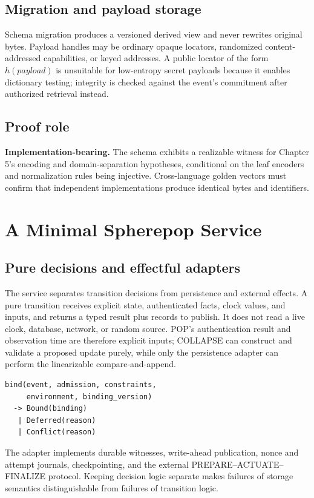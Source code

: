 \documentclass[11pt,openany]{book}
\begin{document}
\section{Migration and payload storage}
Schema migration produces a versioned derived view and never rewrites original
bytes. Payload handles may be ordinary opaque locators, randomized
content-addressed capabilities, or keyed addresses. A public locator of the
form \(h(payload)\) is unsuitable for low-entropy secret payloads because it
enables dictionary testing; integrity is checked against the event's commitment
after authorized retrieval instead.

\section{Proof role}
\textbf{Implementation-bearing.} The schema exhibits a realizable witness for
Chapter 5's encoding and domain-separation hypotheses, conditional on the leaf
encoders and normalization rules being injective. Cross-language golden vectors
must confirm that independent implementations produce identical bytes and
identifiers.

\chapter{A Minimal Spherepop Service}
\section{Pure decisions and effectful adapters}
The service separates transition decisions from persistence and external
effects. A pure transition receives explicit state, authenticated facts, clock
values, and inputs, and returns a typed result plus records to publish. It does
not read a live clock, database, network, or random source. POP's authentication
result and observation time are therefore explicit inputs; COLLAPSE can
construct and validate a proposed update purely, while only the persistence
adapter can perform the linearizable compare-and-append.

\begin{scriptsize}
\begin{verbatim}
bind(event, admission, constraints,
     environment, binding_version)
  -> Bound(binding)
   | Deferred(reason)
   | Conflict(reason)
\end{verbatim}
\end{scriptsize}

The adapter implements durable witnesses, write-ahead publication, nonce and
attempt journals, checkpointing, and the external PREPARE--ACTUATE--FINALIZE
protocol. Keeping decision logic separate makes failures of storage semantics
distinguishable from failures of transition logic.
\end{document}
